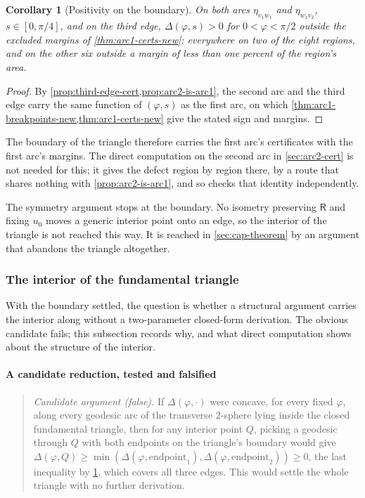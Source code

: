 \documentclass[11pt,reqno]{amsart}
\renewcommand{\_}{\origunderscore\allowbreak}
\numberwithin{equation}{section}
\theoremstyle{plain}
\newtheorem{cor}[thm]{Corollary}
\theoremstyle{definition}
\theoremstyle{remark}
\newcommand{\Rt}{\mathsf{R}}                 %
\newcommand{\tilt}{\varphi}                  %
\newcommand{\arcp}{s}                        %
\newcommand{\dev}{\eta}                      %
\newcommand{\defect}{\Delta}                 %
\begin{document}
\begin{cor}[Positivity on the boundary]\label{cor:restated-conjecture-holds}
On both arcs $\dev_{v_1w_1}$ and $\dev_{w_1v_2}$, $\arcp\in[0,\pi/4]$, and
on the third edge, $\defect(\tilt,\arcp)>0$ for $0<\tilt<\pi/2$ outside
the excluded margins of \cref{thm:arc1-certs-new}: everywhere on two of
the eight regions, and on the other six outside a margin of less than
one percent of the region's area.
\end{cor}

\begin{proof}
By \cref{prop:third-edge-cert,prop:arc2-is-arc1}, the second arc and the
third edge carry the same function of $(\tilt,\arcp)$ as the first arc,
on which \cref{thm:arc1-breakpoints-new,thm:arc1-certs-new} give the
stated sign and margins.
\end{proof}

The boundary of the triangle therefore carries the first arc's
certificates with the first arc's margins. The direct computation on the
second arc in \cref{sec:arc2-cert} is not needed for this; it gives the
defect region by region there, by a route that shares nothing with
\cref{prop:arc2-is-arc1}, and so checks that identity independently.

The symmetry argument stops at the boundary. No isometry preserving
$\Rt$ and fixing $u_0$ moves a generic interior point onto an edge, so
the interior of the triangle is not reached this way. It is reached in
\cref{sec:cap-theorem} by an argument that abandons the triangle
altogether.

\subsubsection{The interior of the fundamental triangle}\label{sec:interior-structure}

With the boundary settled, the question is whether a structural argument
carries the interior along without a two-parameter closed-form
derivation. The obvious candidate fails; this subsection records
why, and what direct computation shows about the structure of the
interior.

\paragraph{A candidate reduction, tested and falsified}

\begin{quote}
\emph{Candidate argument (false).} If
$\defect(\tilt,\cdot)$ were concave, for every fixed $\tilt$, along every
geodesic arc of the transverse $2$-sphere lying inside the closed
fundamental triangle, then for any interior point $Q$, picking a
geodesic through $Q$ with both endpoints on the triangle's boundary
would give $\defect(\tilt,Q)\ge\min(\defect(\tilt,\mathrm{endpoint}_1),
\defect(\tilt,\mathrm{endpoint}_2))\ge0$, the last inequality by
\cref{cor:restated-conjecture-holds}, which covers all three edges.
This would settle the whole triangle with no further derivation.
\end{quote}
\end{document}
